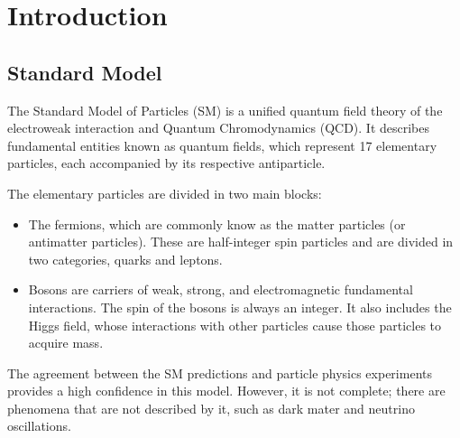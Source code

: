 \chapter{Introduction}
\minitoc
\label{Cap:Int}
% 
\section{Standard Model}
\label{Cap:Int:SM}
The Standard Model of Particles (SM) is a unified quantum field theory of the electroweak interaction and Quantum Chromodynamics (QCD). It describes fundamental entities known as quantum fields, which represent 17 elementary particles, each accompanied by its respective antiparticle.

The elementary particles are divided in two main blocks: 
\begin{itemize}
    \item The fermions, which are commonly know as the matter particles (or antimatter particles). These are half-integer spin particles and are divided in two categories, quarks and leptons. 
    \item Bosons are carriers of weak, strong, and electromagnetic fundamental interactions. The spin of the bosons is always an integer. It also includes the Higgs field, whose interactions with other particles cause those particles to acquire mass.
\end{itemize}

The agreement between the SM predictions and particle physics experiments provides a high confidence in this model. However, it is not complete; there are phenomena that are not described by it, such as dark mater and neutrino oscillations.


